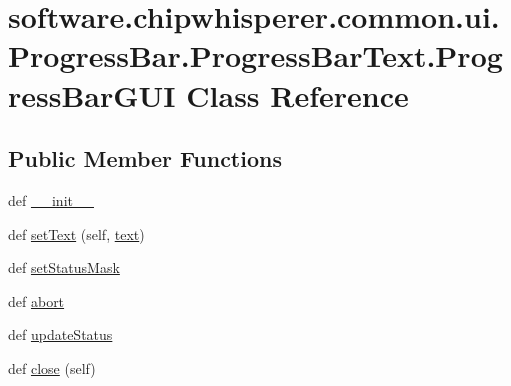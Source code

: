 \hypertarget{classsoftware_1_1chipwhisperer_1_1common_1_1ui_1_1ProgressBar_1_1ProgressBarText_1_1ProgressBarGUI}{}\section{software.\+chipwhisperer.\+common.\+ui.\+Progress\+Bar.\+Progress\+Bar\+Text.\+Progress\+Bar\+G\+U\+I Class Reference}
\label{classsoftware_1_1chipwhisperer_1_1common_1_1ui_1_1ProgressBar_1_1ProgressBarText_1_1ProgressBarGUI}
\subsection*{Public Member Functions}
\begin{DoxyCompactItemize}
\item 
def \hyperlink{classsoftware_1_1chipwhisperer_1_1common_1_1ui_1_1ProgressBar_1_1ProgressBarText_1_1ProgressBarGUI_a00bf3d9ba7baa7ee6a1c2a594d28d1d7}{\+\_\+\+\_\+init\+\_\+\+\_\+}
\item 
def \hyperlink{classsoftware_1_1chipwhisperer_1_1common_1_1ui_1_1ProgressBar_1_1ProgressBarText_1_1ProgressBarGUI_a0f696b44a0dcf26115956952634c2782}{set\+Text} (self, \hyperlink{classsoftware_1_1chipwhisperer_1_1common_1_1ui_1_1ProgressBar_1_1ProgressBarText_a84ed0b07cd0f4f82c0abe0c0b6666dd0}{text})
\item 
def \hyperlink{classsoftware_1_1chipwhisperer_1_1common_1_1ui_1_1ProgressBar_1_1ProgressBarText_1_1ProgressBarGUI_a2b5f184c7b726b6d268ab54870f508f7}{set\+Status\+Mask}
\item 
def \hyperlink{classsoftware_1_1chipwhisperer_1_1common_1_1ui_1_1ProgressBar_1_1ProgressBarText_1_1ProgressBarGUI_aa8319fecf0be3105d201a818cff54476}{abort}
\item 
def \hyperlink{classsoftware_1_1chipwhisperer_1_1common_1_1ui_1_1ProgressBar_1_1ProgressBarText_1_1ProgressBarGUI_a276e64d73aa206241d5cf7e8c8aed18c}{update\+Status}
\item 
def \hyperlink{classsoftware_1_1chipwhisperer_1_1common_1_1ui_1_1ProgressBar_1_1ProgressBarText_1_1ProgressBarGUI_a4c16ef98ec0c879c7b3512a26d460bc7}{close} (self)
\end{DoxyCompactItemize}
